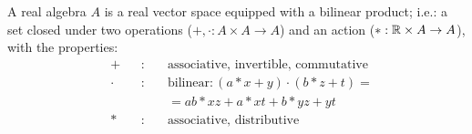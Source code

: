 \begin{definition}[Algebra]\label{d:algebra}
    A real algebra $A$ is a real vector space equipped with a bilinear product; i.e.: a set closed under two operations ($+, \cdot: A\times A \to A$) and an action ($*: \mathbb{R} \times A \to A$), with the properties:
    \[\begin{alignedat}{3}
        &+ &&: \ &&\text{associative, invertible, commutative}\\
        &\cdot &&: \ &&\text{bilinear}: (a*x + y)\cdot (b*z + t) = \\
        & && &&= ab*xz + a*xt + b*yz + yt  \\
        &* &&: \ &&\text{associative, distributive}
    \end{alignedat}\]
\end{definition}
